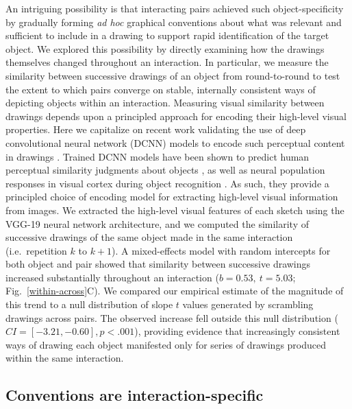 \documentclass[11pt,letterpaper]{article}
\begin{document}
An intriguing possibility is that interacting pairs achieved such object-specificity by gradually forming \textit{ad hoc} graphical conventions about what was relevant and sufficient to include in a drawing to support rapid identification of the target object.
We explored this possibility by directly examining how the drawings themselves changed throughout an interaction.
In particular, we measure the similarity between successive drawings of an object from round-to-round to test the extent to which pairs converge on stable, internally consistent ways of depicting objects within an interaction.
Measuring visual similarity between drawings depends upon a principled approach for encoding their high-level visual properties.
Here we capitalize on recent work validating the use of deep convolutional neural network (DCNN) models to encode such perceptual content in drawings \cite{FanCommon2018}.
Trained DCNN models have been shown to predict human perceptual similarity judgments about objects \cite{kubilius2016deep,peterson2018evaluating}, as well as neural population responses in visual cortex during object recognition \cite{yamins2014performance,gucclu2015deep}.
As such, they provide a principled choice of encoding model for extracting high-level visual information from images.
We extracted the high-level visual features of each sketch using the VGG-19 neural network architecture, and we computed the similarity of successive drawings of the same object made in the same interaction (i.e.~repetition $k$ to $k+1$). 
A mixed-effects model with random intercepts for both object and pair showed that similarity between successive drawings increased substantially throughout an interaction ($b = 0.53,~t = 5.03$; Fig.~\ref{within-across}C).
We compared our empirical estimate of the magnitude of this trend to a null distribution of slope $t$ values generated by scrambling drawings across pairs. 
The observed increase fell outside this null distribution ($CI = [-3.21, -0.60], p < .001$), providing evidence that increasingly consistent ways of drawing each object manifested only for series of drawings produced within the same interaction.

\subsection{Conventions are interaction-specific}
\end{document}
